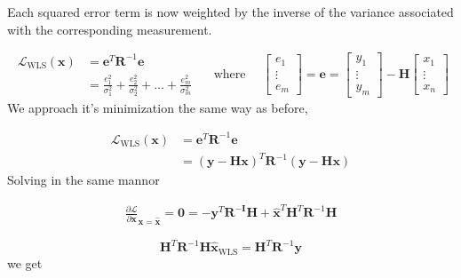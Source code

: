 \documentclass{article}
\begin{document}
Each squared error term is now weighted by the inverse of the variance associated with the corresponding measurement.

\begin{equation}
\begin{aligned} \mathscr{L}_{\mathrm{WLS}}(\mathbf{x}) &=\mathbf{e}^{T} \mathbf{R}^{-1} \mathbf{e} \\ &=\frac{e_{1}^{2}}{\sigma_{1}^{2}}+\frac{e_{2}^{2}}{\sigma_{2}^{2}}+\ldots+\frac{e_{m}^{2}}{\sigma_{m}^{2}} \end{aligned} \quad \text { where } \quad\left[\begin{array}{c}{e_{1}} \\ {\vdots} \\ {e_{m}}\end{array}\right]=\mathbf{e}=\left[\begin{array}{c}{y_{1}} \\ {\vdots} \\ {y_{m}}\end{array}\right]-\mathbf{H}\left[\begin{array}{c}{x_{1}} \\ {\vdots} \\ {x_{n}}\end{array}\right]
\end{equation}
We approach it's minimization the same way as before,

\begin{equation}
\begin{aligned} \mathscr{L}_{\mathrm{WLS}}(\mathbf{x}) &=\mathbf{e}^{T} \mathbf{R}^{-1} \mathbf{e} \\ &=(\mathbf{y}-\mathbf{H} \mathbf{x})^{T} \mathbf{R}^{-1}(\mathbf{y}-\mathbf{H} \mathbf{x}) \end{aligned}
\end{equation}
Solving in the same mannor

\begin{equation}
  \begin{array}{c}
  \frac{\partial \mathscr{L}}{\partial \mathbf{x}}_{\mathbf{x}=\mathbf{\hat{x}}}
=\mathbf{0}=-\mathbf{y}^{T} \mathbf{R}^{-\mathbf{I}} \mathbf{H}+\hat{\mathbf{x}}^{T} 
\mathbf{H}^{T} \mathbf{R}^{-1} \mathbf{H} 
\end{array}
\end{equation}

\begin{equation}
 \mathbf{H}^{T} \mathbf{R}^{-1} \mathbf{H} \hat{\mathbf{x}}_{\text{WLS}}=\mathbf{H}^{T} \mathbf{R}^{-1} \mathbf{y}
\end{equation}
we get
\end{document}
